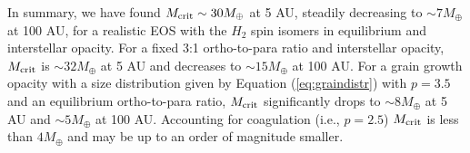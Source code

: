 In summary, we have found $M_{\rm crit}\sim 30 M_{\oplus}$ at 5 AU, steadily decreasing to $\sim$$7 M_{\oplus}$ at 100 AU, for a realistic EOS with the $H_2$ spin isomers in equilibrium and interstellar opacity. For a fixed 3:1 ortho-to-para ratio and interstellar opacity, $M_{\rm crit}$ is $\sim$$32 M_{\oplus}$ at 5 AU and decreases to $\sim$$15 M_{\oplus}$ at 100 AU. For a grain growth opacity with a size distribution given by Equation (\ref{eq:graindistr}) with $p=3.5$ and an equilibrium ortho-to-para ratio, $M_{\rm crit}$ significantly drops to $\sim$$8 M_{\oplus}$ at 5 AU and $\sim$$5 M_{\oplus}$ at 100 AU. Accounting for coagulation (i.e., $p=2.5$) $M_{\rm crit}$ is less than $4M_\oplus$ and may be up to an order of magnitude smaller.







